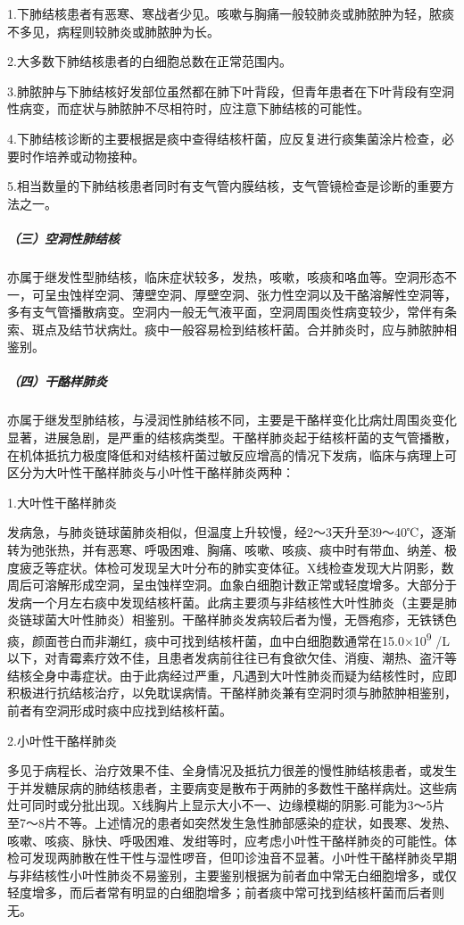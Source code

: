 1.下肺结核患者有恶寒、寒战者少见。咳嗽与胸痛一般较肺炎或肺脓肿为轻，脓痰不多见，病程则较肺炎或肺脓肿为长。

2.大多数下肺结核患者的白细胞总数在正常范围内。

3.肺脓肿与下肺结核好发部位虽然都在肺下叶背段，但青年患者在下叶背段有空洞性病变，而症状与肺脓肿不尽相符时，应注意下肺结核的可能性。

4.下肺结核诊断的主要根据是痰中查得结核杆菌，应反复进行痰集菌涂片检查，必要时作培养或动物接种。

5.相当数量的下肺结核患者同时有支气管内膜结核，支气管镜检查是诊断的重要方法之一。

\subparagraph{（三）空洞性肺结核}

亦属于继发性型肺结核，临床症状较多，发热，咳嗽，咳痰和咯血等。空洞形态不一，可呈虫蚀样空洞、薄壁空洞、厚壁空洞、张力性空洞以及干酪溶解性空洞等，多有支气管播散病变。空洞内一般无气液平面，空洞周围炎性病变较少，常伴有条索、斑点及结节状病灶。痰中一般容易检到结核杆菌。合并肺炎时，应与肺脓肿相鉴别。

\subparagraph{（四）干酪样肺炎}

亦属于继发型肺结核，与浸润性肺结核不同，主要是干酪样变化比病灶周围炎变化显著，进展急剧，是严重的结核病类型。干酪样肺炎起于结核杆菌的支气管播散，在机体抵抗力极度降低和对结核杆菌过敏反应增高的情况下发病，临床与病理上可区分为大叶性干酪样肺炎与小叶性干酪样肺炎两种：

\hypertarget{text00025.htmlux5cux23CHP2-7-1-2-7-4-1}{}
1.大叶性干酪样肺炎

发病急，与肺炎链球菌肺炎相似，但温度上升较慢，经2～3天升至39～40℃，逐渐转为弛张热，并有恶寒、呼吸困难、胸痛、咳嗽、咳痰、痰中时有带血、纳差、极度疲乏等症状。体检可发现呈大叶分布的肺实变体征。X线检查发现大片阴影，数周后可溶解形成空洞，呈虫蚀样空洞。血象白细胞计数正常或轻度增多。大部分于发病一个月左右痰中发现结核杆菌。此病主要须与非结核性大叶性肺炎（主要是肺炎链球菌大叶性肺炎）相鉴别。干酪样肺炎发病较后者为慢，无唇疱疹，无铁锈色痰，颜面苍白而非潮红，痰中可找到结核杆菌，血中白细胞数通常在15.0×10\textsuperscript{9}
/L以下，对青霉素疗效不佳，且患者发病前往往已有食欲欠佳、消瘦、潮热、盗汗等结核全身中毒症状。由于此病经过严重，凡遇到大叶性肺炎而疑为结核性时，应即积极进行抗结核治疗，以免耽误病情。干酪样肺炎兼有空洞时须与肺脓肿相鉴别，前者有空洞形成时痰中应找到结核杆菌。

\hypertarget{text00025.htmlux5cux23CHP2-7-1-2-7-4-2}{}
2.小叶性干酪样肺炎

多见于病程长、治疗效果不佳、全身情况及抵抗力很差的慢性肺结核患者，或发生于并发糖尿病的肺结核患者，主要病变是散布于两肺的多数性干酪样病灶。这些病灶可同时或分批出现。X线胸片上显示大小不一、边缘模糊的阴影.可能为3～5片至7～8片不等。上述情况的患者如突然发生急性肺部感染的症状，如畏寒、发热、咳嗽、咳痰、脉快、呼吸困难、发绀等时，应考虑小叶性干酪样肺炎的可能性。体检可发现两肺散在性干性与湿性啰音，但叩诊浊音不显著。小叶性干酪样肺炎早期与非结核性小叶性肺炎不易鉴别，主要鉴别根据为前者血中常无白细胞增多，或仅轻度增多，而后者常有明显的白细胞增多；前者痰中常可找到结核杆菌而后者则无。

